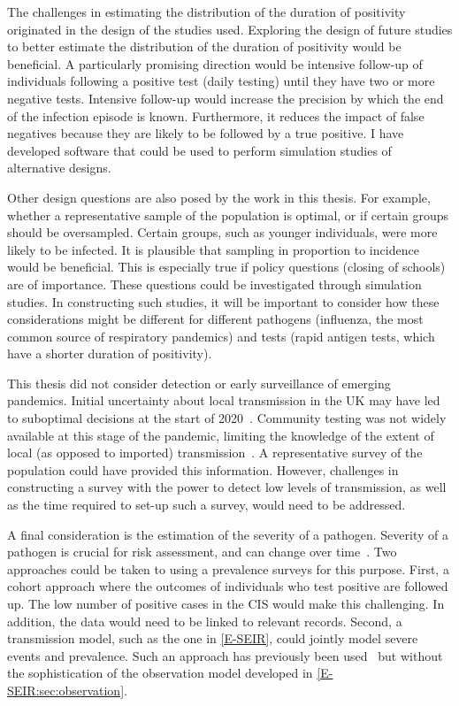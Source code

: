 \documentclass[thesis.tex]{subfiles}
\begin{document}
The challenges in estimating the distribution of the duration of positivity originated in the design of the studies used.
Exploring the design of future studies to better estimate the distribution of the duration of positivity would be beneficial.
A particularly promising direction would be intensive follow-up of individuals following a positive test (\eg daily testing) until they have two or more negative tests.
Intensive follow-up would increase the precision by which the end of the infection episode is known.
Furthermore, it reduces the impact of false negatives because they are likely to be followed by a true positive.
I have developed software that could be used to perform simulation studies of alternative designs.

Other design questions are also posed by the work in this thesis.
For example, whether a representative sample of the population is optimal, or if certain groups should be oversampled.
Certain groups, such as younger individuals, were more likely to be infected.
It is plausible that sampling in proportion to incidence would be beneficial.
This is especially true if policy questions (\eg closing of schools) are of importance.
These questions could be investigated through simulation studies.
In constructing such studies, it will be important to consider how these considerations might be different for different pathogens (\eg influenza, the most common source of respiratory pandemics) and tests (\eg rapid antigen tests, which have a shorter duration of positivity).

This thesis did not consider detection or early surveillance of emerging pandemics.
Initial uncertainty about local transmission in the UK may have led to suboptimal decisions at the start of 2020~\autocite{pellisChallenges}.
Community testing was not widely available at this stage of the pandemic, limiting the knowledge of the extent of local (as opposed to imported) transmission~\autocite{whittyTechReportCOVID}.
A representative survey of the population could have provided this information.
However, challenges in constructing a survey with the power to detect low levels of transmission, as well as the time required to set-up such a survey, would need to be addressed.

A final consideration is the estimation of the severity of a pathogen.
Severity of a pathogen is crucial for risk assessment, and can change over time~\autocite[e.g.][]{kirwanSeverityTrends}.
Two approaches could be taken to using a prevalence surveys for this purpose.
First, a cohort approach where the outcomes of individuals who test positive are followed up.
The low number of positive cases in the CIS would make this challenging.
In addition, the data would need to be linked to relevant records.
Second, a transmission model, such as the one in \cref{E-SEIR}, could jointly model severe events and prevalence.
Such an approach has previously been used~\autocite{daviesAssociation,ironsEstimating,knockKey,nicholsonImproving,pooleyEstimation,birrellRTM2} but without the sophistication of the observation model developed in \cref{E-SEIR:sec:observation}.

\ifSubfilesClassLoaded{
  \listoftodos
}{}
\end{document}
